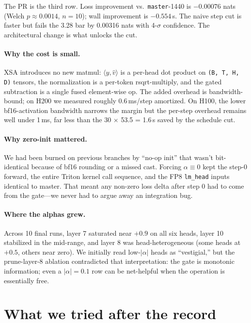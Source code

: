 \documentclass[10pt,letterpaper]{article}
\newcommand{\code}[1]{\texttt{\small #1}}
\begin{document}
The PR is the third row. Loss improvement vs.\ \code{master}-1440 is $-0.00076$ nats (Welch $p\approx 0.0014$, $n=10$); wall improvement is $-0.554$\,s. The naive step cut is faster but fails the 3.28 bar by 0.00316 nats with 4-$\sigma$ confidence. The architectural change is what unlocks the cut.

\paragraph{Why the cost is small.} XSA introduces no new matmul: $\langle y, \hat v\rangle$ is a per-head dot product on \code{(B, T, H, D)} tensors, the normalization is a per-token rsqrt-multiply, and the gated subtraction is a single fused element-wise op. The added overhead is bandwidth-bound; on H200 we measured roughly 0.6\,ms/step amortized. On H100, the lower bf16-activation bandwidth narrows the margin but the per-step overhead remains well under 1\,ms, far less than the 30 \(\times\) 53.5 = 1.6\,s saved by the schedule cut.

\paragraph{Why zero-init mattered.} We had been burned on previous branches by ``no-op init'' that wasn't bit-identical because of bf16 rounding or a missed cast. Forcing $\alpha\!\equiv\!0$ kept the step-0 forward, the entire Triton kernel call sequence, and the FP8 \code{lm\_head} inputs identical to master. That meant any non-zero loss delta after step 0 had to come from the gate---we never had to argue away an integration bug.

\paragraph{Where the alphas grew.} Across 10 final runs, layer 7 saturated near $+0.9$ on all six heads, layer 10 stabilized in the mid-range, and layer 8 was head-heterogeneous (some heads at $+0.5$, others near zero). We initially read low-$|\alpha|$ heads as ``vestigial,'' but the prune-layer-8 ablation contradicted that interpretation: the gate is monotonic information; even a $|\alpha|=0.1$ row can be net-helpful when the operation is essentially free.

\section{What we tried after the record}
\label{sec:after}
\end{document}
